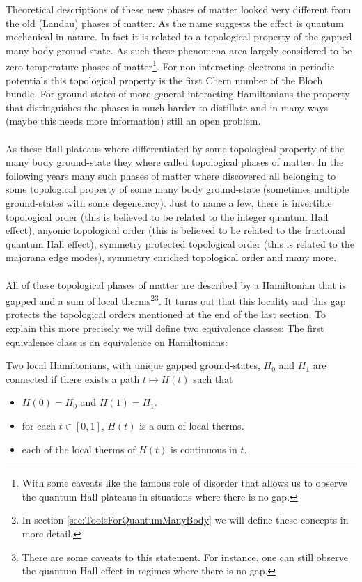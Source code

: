 Theoretical descriptions of these new phases of matter looked very different from the old (Landau) phases of matter. As the name suggests the effect is quantum mechanical in nature. In fact it is related to a topological property of the gapped many body ground state. As such these phenomena area largely considered to be zero temperature phases of matter\footnote{With some caveats like the famous role of disorder that allows us to observe the quantum Hall plateaus in situations where there is no gap.}. For non interacting electrons in periodic potentials this topological property is the first Chern number of the Bloch bundle. For ground-states of more general interacting Hamiltonians the property that distinguishes the phases is much harder to distillate and in many ways (maybe this needs more information) still an open problem.\\\\
As these Hall plateaus where differentiated by some topological property of the many body ground-state they where called topological phases of matter. In the following years many such phases of matter where discovered all belonging to some topological property of some many body ground-state (sometimes multiple ground-states with some degeneracy). Just to name a few, there is invertible topological order (this is believed to be related to the integer quantum Hall effect), anyonic topological order (this is believed to be related to the fractional quantum Hall effect), symmetry protected topological order (this is related to the majorana edge modes), symmetry enriched topological order and many more.
\\\\
All of these topological phases of matter are described by a Hamiltonian that is gapped and a sum of local therms\footnote{In section \ref{sec:ToolsForQuantumManyBody} we will define these concepts in more detail.}\footnote{There are some caveats to this statement. For instance, one can still observe the quantum Hall effect in regimes where there is no gap.}. It turns out that this locality and this gap protects the topological orders mentioned at the end of the last section. To explain this more precisely we will define two equivalence classes: The first equivalence class is an equivalence on Hamiltonians:
\begin{definition}\label{def:ConnectedHamiltonians}
	Two local Hamiltonians, with unique gapped ground-states, $H_0$ and $H_1$ are connected if there exists a path $t\mapsto H(t)$ such that
	\begin{itemize}
		\item $H(0)=H_0$ and $H(1)=H_1$.
		\item for each $t\in[0,1]$, $H(t)$ is a sum of local therms.
		\item each of the local therms of $H(t)$ is continuous in $t$.
	\end{itemize}
\end{definition}
